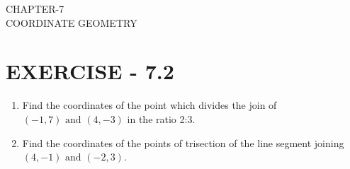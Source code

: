 \documentclass[12pt]{article}
\begin{document}
\begin{center}
\textbf\large{CHAPTER-7 \\ COORDINATE GEOMETRY}
\end{center}

\section*{EXERCISE - 7.2}
\begin{enumerate}

\item Find the coordinates of the point which divides the join of $(-1,7) \text{ and } (4,-3)$ in the ratio 2:3.
\item Find the coordinates of the points of trisection of the line segment joining $(4,-1) \text{ and } (-2,3)$.


\end{enumerate}
\end{document}
